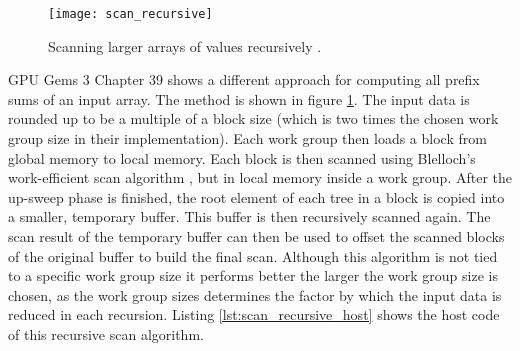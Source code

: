 \begin{figure}[h]
\centering
\texttt{[image: scan\_recursive]}
\caption{Scanning larger arrays of values recursively \cite{gpu_gems_3_chapter_39}.}
\label{fig:scan_recursive}
\end{figure}

GPU Gems 3 Chapter 39 \cite{gpu_gems_3_chapter_39} shows a different approach for computing all prefix sums of an input array. The method is shown in figure \ref{fig:scan_recursive}. The input data is rounded up to be a multiple of a block size (which is two times the chosen work group size in their implementation). Each work group then loads a block from global memory to local memory. Each block is then scanned using Blelloch's work-efficient scan algorithm \cite{scan_blelloch}, but in local memory inside a work group. After the up-sweep phase is finished, the root element of each tree in a block is copied into a smaller, temporary buffer. This buffer is then recursively scanned again. The scan result of the temporary buffer can then be used to offset the scanned blocks of the original buffer to build the final scan.
Although this algorithm is not tied to a specific work group size it performs better the larger the work group size is chosen, as the work group sizes determines the factor by which the input data is reduced in each recursion.
Listing \ref{lst:scan_recursive_host} shows the host code of this recursive scan algorithm.



